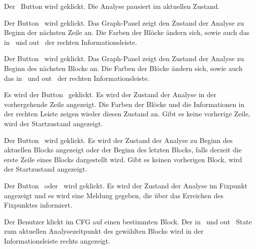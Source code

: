 {Der \faPause\ Button wird geklickt.}
{Die Analyse pausiert im aktuellen Zustand.}

{Der Button \faStepForward\ wird geklickt.}
{Das Graph-Panel zeigt den Zustand der Analyse zu Beginn der nächsten Zeile an. Die Farben der Blöcke ändern sich, sowie auch das \glqq in \grqq\ und \glqq out \grqq\ der rechten Informationsleiste.}

{Der Button \faFastForward\ wird geklickt.}
{Das Graph-Panel zeigt den Zustand der Analyse zu Beginn des nächsten Blocks an. Die Farben der Blöcke ändern sich, sowie auch das \glqq in \grqq\ und \glqq out \grqq\ der rechten Informationsleiste.}

{Es wird der Button \faStepBackward\ geklickt.}
{Es wird der Zustand der Analyse in der vorhergehende Zeile angezeigt. Die Farben der Blöcke und die Informationen in der rechten Leiste zeigen wieder diesen Zustand an. Gibt es keine vorherige Zeile, wird der Startzustand angezeigt.}

{Der Button \faFastBackward\ wird geklickt.}
{Es wird der Zustand der Analyse zu Beginn des aktuellen Blocks angezeigt oder der Beginn des letzten Blocks, falls derzeit die erste Zeile eines Blocks dargestellt wird. Gibt es keinen vorherigen Block, wird der Startzustand angezeigt.}

{Der Button \faStepForward\ oder \faFastForward\ wird geklickt.}
{Es wird der Zustand der Analyse im Fixpunkt angezeigt und es wird eine Meldung gegeben, die über das Erreichen des Fixpunktes informiert.}



{Der Benutzer klickt im CFG auf einen bestimmten Block.}
{Der \glqq in \grqq\ und \glqq out \grqq\ State zum aktuellen Analysezeitpunkt des gewählten Blocks wird in der Informationsleiste rechts angezeigt.}

